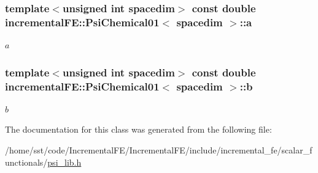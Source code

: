 \subsubsection[{\texorpdfstring{a}{a}}]{\setlength{\rightskip}{0pt plus 5cm}template$<$unsigned int spacedim$>$ const double {\bf incremental\+F\+E\+::\+Psi\+Chemical01}$<$ spacedim $>$\+::a\hspace{0.3cm}{\ttfamily [private]}}\hypertarget{classincremental_f_e_1_1_psi_chemical01_a8af1cff2abb682cf14582de4a9a1bc85}{}\label{classincremental_f_e_1_1_psi_chemical01_a8af1cff2abb682cf14582de4a9a1bc85}
$a$ 
\subsubsection[{\texorpdfstring{b}{b}}]{\setlength{\rightskip}{0pt plus 5cm}template$<$unsigned int spacedim$>$ const double {\bf incremental\+F\+E\+::\+Psi\+Chemical01}$<$ spacedim $>$\+::b\hspace{0.3cm}{\ttfamily [private]}}\hypertarget{classincremental_f_e_1_1_psi_chemical01_ad445df6815f30a51be2b2443b0477871}{}\label{classincremental_f_e_1_1_psi_chemical01_ad445df6815f30a51be2b2443b0477871}
$b$ 

The documentation for this class was generated from the following file\+:\begin{DoxyCompactItemize}
\item 
/home/sst/code/\+Incremental\+F\+E/\+Incremental\+F\+E/include/incremental\+\_\+fe/scalar\+\_\+functionals/\hyperlink{psi__lib_8h}{psi\+\_\+lib.\+h}\end{DoxyCompactItemize}

